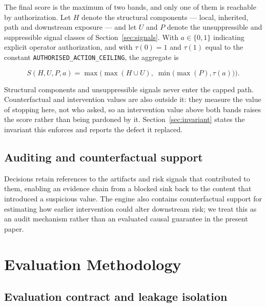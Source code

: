 \documentclass[letterpaper,twocolumn,10pt]{article}
\begin{document}
The final score is the maximum of two bands, and only one of them is reachable
by authorization. Let $H$ denote the structural components --- local,
inherited, path and downstream exposure --- and let $U$ and $P$ denote the
unsuppressible and suppressible signal classes of
Section~\ref{sec:signals}. With $a \in \{0,1\}$ indicating explicit operator
authorization, and with $\tau(0) = 1$ and $\tau(1)$ equal to the constant
\texttt{AUTHORISED\_ACTION\_CEILING}, the aggregate is

\begin{equation}
S(H, U, P, a) = \max\Big( \max(H \cup U),\; \min\big( \max(P), \tau(a) \big) \Big).
\label{eq:aggregate}
\end{equation}

Structural components and unsuppressible signals never enter the capped path.
Counterfactual and intervention values are also outside it: they measure the
value of stopping here, not who asked, so an intervention value above both
bands raises the score rather than being pardoned by it.
Section~\ref{sec:invariant} states the invariant this enforces and reports the
defect it replaced.

\subsection{Auditing and counterfactual support}
\label{sec:auditing}

Decisions retain references to the artifacts and risk signals that contributed
to them, enabling an evidence chain from a blocked sink back to the content
that introduced a suspicious value. The engine also contains counterfactual
support for estimating how earlier intervention could alter downstream risk; we
treat this as an audit mechanism rather than an evaluated causal guarantee in
the present paper.

\section{Evaluation Methodology}
\label{sec:methodology}

\subsection{Evaluation contract and leakage isolation}
\label{sec:contract}
\end{document}
